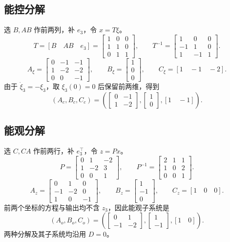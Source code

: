 \documentclass[UTF8,a4paper,12pt,fontset=fandol]{ctexart}
\begin{document}
\subsection*{能控分解}
选 $B,AB$ 作前两列，补 $e_3$，令 $x=T\xi$。
\[
 T=[B\quad AB\quad e_3]=\begin{bmatrix}1&0&0\\1&1&0\\0&1&1\end{bmatrix},
 \qquad T^{-1}=\begin{bmatrix}1&0&0\\-1&1&0\\1&-1&1\end{bmatrix}.
\]
\[
 A_\xi=\begin{bmatrix}0&-1&-1\\1&-2&-2\\0&0&-1\end{bmatrix},
 \qquad B_\xi=\begin{bmatrix}1\\0\\0\end{bmatrix},
 \qquad C_\xi=[1\quad-1\quad-2].
\]
由于 $\dot\xi_3=-\xi_3$，取 $\xi_3(0)=0$ 后保留前两维，得到
\[
 (A_c,B_c,C_c)=
 \left(\begin{bmatrix}0&-1\\1&-2\end{bmatrix},
       \begin{bmatrix}1\\0\end{bmatrix},[1\quad-1]\right).
\]

\subsection*{能观分解}
选 $C,CA$ 作前两行，补 $e_3^\top$，令 $z=Px$。
\[
 P=\begin{bmatrix}0&1&-2\\1&-2&3\\0&0&1\end{bmatrix},
 \qquad P^{-1}=\begin{bmatrix}2&1&1\\1&0&2\\0&0&1\end{bmatrix}.
\]
\[
 A_z=\begin{bmatrix}0&1&0\\-1&-2&0\\1&0&-1\end{bmatrix},
 \qquad B_z=\begin{bmatrix}1\\-1\\0\end{bmatrix},
 \qquad C_z=[1\quad0\quad0].
\]
前两个坐标的方程与输出均不含 $z_3$，因此能观子系统是
\[
 (A_o,B_o,C_o)=
 \left(\begin{bmatrix}0&1\\-1&-2\end{bmatrix},
       \begin{bmatrix}1\\-1\end{bmatrix},[1\quad0]\right).
\]
两种分解及其子系统均沿用 $D=0$。
\end{document}
